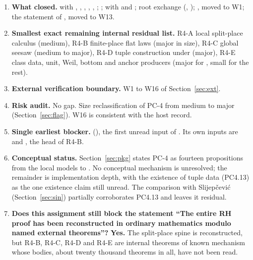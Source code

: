\documentclass[11pt]{article}
\begin{document}
\begin{enumerate}[leftmargin=*,itemsep=3pt]
\item \textbf{What closed.}  with , , , , , ; ;  with  and ; root exchange (, ); , moved to W1; the statement of , moved to W13.
\item \textbf{Smallest exact remaining internal residual list.} R4-A local split-place calculus (medium), R4-B finite-place flat laws (major in size), R4-C global seesaw (medium to major), R4-D tuple construction under  (major), R4-E class data, unit, Weil, bottom and anchor producers (major for , small for the rest).
\item \textbf{External verification boundary.} W1 to W16 of Section~\ref{sec:ext}.
\item \textbf{Risk audit.} No gap. Size reclassification of PC-4 from medium to major (Section~\ref{sec:flag}). W16 is consistent with the host record.
\item \textbf{Single earliest blocker.}  (), the first unread input of . Its own inputs are  and , the head of R4-B.
\item \textbf{Conceptual status.} Section~\ref{sec:pkg} states PC-4 as fourteen propositions from the local models to . No conceptual mechanism is unresolved; the remainder is implementation depth, with the existence of tuple data (PC4.13) as the one existence claim still unread. The comparison with Slijepčević (Section~\ref{sec:sin}) partially corroborates PC4.13 and leaves it residual.
\item \textbf{Does this assignment still block the statement ``The entire RH proof has been reconstructed in ordinary mathematics modulo named external theorems''?} \textbf{Yes.} The split-place spine is reconstructed, but R4-B, R4-C, R4-D and R4-E are internal theorems of known mechanism whose bodies, about twenty thousand theorems in all, have not been read.
\end{enumerate}
\end{document}
